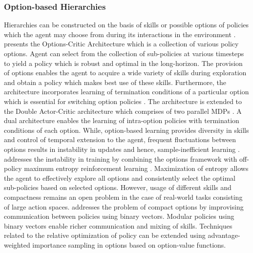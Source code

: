 \documentclass{article}
\begin{document}
\subsubsection{Option-based Hierarchies}
Hierarchies can be constructed on the basis of skills or possible options of policies which the agent may choose from during its interactions in the environment \cite{sutton,option}. \cite{option} presents the Options-Critic Architecture which is a collection of various policy options. Agent can select from the collection of sub-policies at various timesteps to yield a policy which is robust and optimal in the long-horizon. The provision of options enables the agent to acquire a wide variety of skills during exploration and obtain a policy which makes best use of these skills. Furthermore, the architecture incorporates learning of termination conditions of a particular option which is essential for switching option policies \cite{termination}. The architecture is extended to the Double Actor-Critic architecture which comprises of two parallel MDPs \cite{doubleoption}. A dual architecture enables the learning of intra-option policies with termination conditions of each option. While, option-based learning provides diversity in skills and control of temporal extension to the agent, frequent fluctuations between options results in instability in updates and hence, sample-inefficient learning \cite{soac}. \cite{soac} addresses the instability in training by combining the options framework with off-policy maximum entropy reinforcement learning \cite{sac,sql}. Maximization of entropy allows the agent to effectively explore all options and consistently select the optimal sub-policies based on selected options. However, usage of different skills and compactness remains an open problem in the case of real-world tasks consisting of large action spaces. \cite{mpc} addresses the problem of compact options by improvising communication between policies using binary vectors. Modular policies using binary vectors enable richer communication and mixing of skills. Techniques related to the relative optimization of policy can be extended using advantage-weighted importance sampling \cite{advantage} in options based on option-value functions.   
\end{document}

